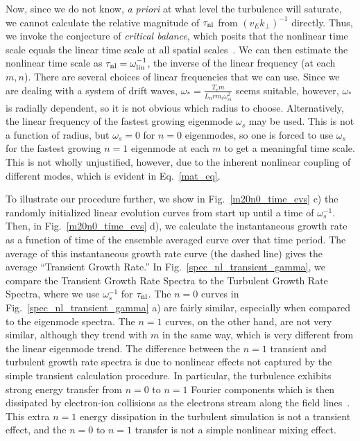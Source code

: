\documentclass[showpacs,preprintnumbers,amsmath,amssymb,superscriptaddress,aip]{revtex4-1}
\begin{document}
Now, since we do not know, \emph{a priori} at what level the turbulence will saturate, we cannot calculate the relative magnitude of $\tau_{\rm{nl}}$ from $(v_E k_\perp)^{-1}$ directly.
Thus, we invoke the conjecture of \emph{critical balance}, which posits that the nonlinear time scale equals the linear time scale at all spatial scales~\cite{schekochihin2012}. 
We can then estimate the nonlinear time scale as $\tau_{\rm{nl}} = \omega_{\rm{lin}}^{-1}$, the inverse of the linear frequency (at each $m,n$).
There are several choices of linear frequencies that we can use. Since we are dealing with a system of drift waves, $\omega_* = \frac{T_e m}{L_n r m_i \omega_{ci}^2}$ seems suitable, however,
$\omega_*$ is radially dependent, so it is not obvious which radius to choose. Alternatively, the linear frequency of the fastest growing eigenmode $\omega_s$ may be used. This is not a function
of radius, but $\omega_s = 0$ for $n=0$ eigenmodes, so one is forced to use $\omega_s$ for the fastest growing $n=1$ eigenmode at each $m$ to get a meaningful time scale. This is not wholly
unjustified, however, due to the inherent nonlinear coupling of different modes, which is evident in Eq.~\ref{mat_eq}.

To illustrate our procedure further, we show in Fig.~\ref{m20n0_time_evs} c) the randomly initialized linear evolution curves from start up until a time of $\omega_s^{-1}$. 
Then, in Fig.~\ref{m20n0_time_evs} d), we calculate the instantaneous growth rate as a function of time of the ensemble averaged curve over that time period.
The average of this instantaneous growth rate curve (the dashed line) gives the average ``Transient Growth Rate.''
In Fig.~\ref{spec_nl_transient_gamma}, we compare the Transient Growth Rate Spectra to the Turbulent Growth Rate Spectra, where we use $\omega_s^{-1}$ for $\tau_{\rm{nl}}$.
The $n=0$ curves in Fig.~\ref{spec_nl_transient_gamma} a) are fairly similar, especially when compared to the eigenmode spectra.
The $n=1$ curves, on the other hand, are not very similar, although they trend with $m$ in the same way, which is very different from the linear eigenmode trend.
The difference between the $n=1$ transient and turbulent growth rate spectra is due to nonlinear effects not captured by the simple transient calculation procedure. In particular, the turbulence
exhibits strong energy transfer from $n=0$ to $n=1$ Fourier components which is then dissipated by electron-ion collisions as the electrons stream along the field lines~\cite{friedman2012b}. 
This extra $n=1$ energy dissipation in the turbulent simulation is not a transient effect, and the $n=0$ to $n=1$ transfer is not a simple nonlinear mixing effect.
\end{document}
